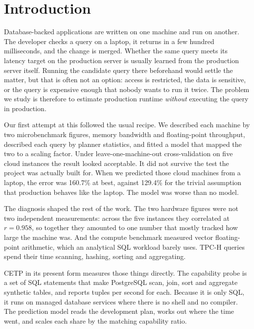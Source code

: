\documentclass[runningheads]{llncs}
\begin{document}
\section{Introduction}

Database-backed applications are written on one machine and run on another.
The developer checks a query on a laptop, it returns in a few hundred
milliseconds, and the change is merged. Whether the same query meets its
latency target on the production server is usually learned from the production
server itself. Running the candidate query there beforehand would settle the
matter, but that is often not an option: access is restricted, the data is
sensitive, or the query is expensive enough that nobody wants to run it twice.
The problem we study is therefore to estimate production runtime
\emph{without} executing the query in production.

Our first attempt at this followed the usual recipe. We described each machine
by two microbenchmark figures, memory bandwidth and floating-point throughput,
described each query by planner statistics, and fitted a model that mapped the
two to a scaling factor. Under leave-one-machine-out cross-validation on five
cloud instances the result looked acceptable. It did not survive the test the
project was actually built for. When we predicted those cloud machines from a
laptop, the error was 160.7\% at best, against 129.4\% for the trivial
assumption that production behaves like the laptop. The model was worse than
no model.

The diagnosis shaped the rest of the work. The two hardware figures were not
two independent measurements: across the five instances they correlated at
$r = 0.958$, so together they amounted to one number that mostly tracked how
large the machine was. And the compute benchmark measured vector
floating-point arithmetic, which an analytical SQL workload barely uses.
TPC-H queries spend their time scanning, hashing, sorting and aggregating.

CETP in its present form measures those things directly. The capability probe
is a set of SQL statements that make PostgreSQL scan, join, sort and aggregate
synthetic tables, and reports tuples per second for each. Because it is only
SQL, it runs on managed database services where there is no shell and no
compiler. The prediction model reads the development plan, works out where
the time went, and scales each share by the matching capability ratio.
\end{document}

